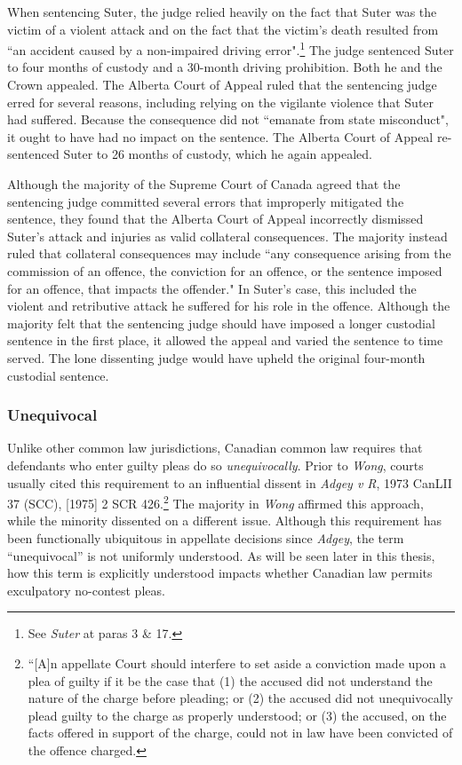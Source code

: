 When sentencing Suter, the judge relied heavily on the fact that Suter was the victim of a violent attack and on the fact that the victim's death resulted from ``an accident caused by a non-impaired driving error".\footnote{See \textit{Suter} at paras 3 \& 17.} The judge sentenced Suter to four months of custody and a 30-month driving prohibition. Both he and the Crown appealed. The Alberta Court of Appeal ruled that the sentencing judge erred for several reasons, including relying on the vigilante violence that Suter had suffered. Because the consequence did not ``emanate from state misconduct", it ought to have had no impact on the sentence. The Alberta Court of Appeal re-sentenced Suter to 26 months of custody, which he again appealed. 

Although the majority of the Supreme Court of Canada agreed that the sentencing judge committed several errors that improperly mitigated the sentence, they found that the Alberta Court of Appeal incorrectly dismissed Suter's attack and injuries as valid collateral consequences. The majority instead ruled that collateral consequences may include ``any consequence arising from the commission of an offence, the conviction for an offence, or the sentence imposed for an offence, that impacts the offender." In Suter's case, this included the violent and retributive attack he suffered for his role in the offence. Although the majority felt that the sentencing judge should have imposed a longer custodial sentence in the first place, it allowed the appeal and varied the sentence to time served. The lone dissenting judge would have upheld the original four-month custodial sentence.

\subsubsection{Unequivocal}

Unlike other common law jurisdictions, Canadian common law requires that defendants who enter guilty pleas do so \textit{unequivocally}. Prior to \textit{Wong}, courts usually cited this requirement to an influential dissent in \textit{Adgey v R}, 1973 CanLII 37 (SCC), [1975] 2 SCR 426.\footnote{``[A]n appellate Court should interfere to set aside a conviction made upon a plea of guilty if it be the case that (1) the accused did not understand the nature of the charge before pleading; or (2) the accused did not unequivocally plead guilty to the charge as properly understood; or (3) the accused, on the facts offered in support of the charge, could not in law have been convicted of the offence charged.} The majority in \textit{Wong} affirmed this approach, while the minority dissented on a different issue. Although this requirement has been functionally ubiquitous in appellate decisions since \textit{Adgey}, the term ``unequivocal'' is not uniformly understood. As will be seen later in this thesis, how this term is explicitly understood impacts whether Canadian law permits exculpatory no-contest pleas.

